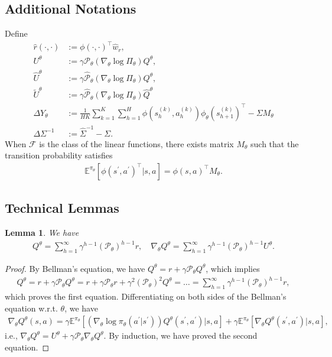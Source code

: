 \documentclass{article}
\newtheorem{lemma}{Lemma}[section]
\numberwithin{equation}{section}
\begin{document}
\subsection{Additional Notations}
Define
\begin{align*}
\widehat{r}(\cdot,\cdot)&:= \phi(\cdot,\cdot)^\top \widehat{w}_r,\\
U^\theta &:=\gamma\mathcal{P}_\theta\left(\nabla_\theta\log\Pi_\theta\right) Q^\theta,\\
\widehat{U}^\theta&:=\gamma\widehat{\mathcal{P}}_\theta\left(\nabla_\theta\log\Pi_\theta\right)Q^\theta,\\
\tilde{U}^\theta&:=\gamma\widehat{\mathcal{P}}_\theta\left(\nabla_\theta\log\Pi_\theta\right)\widehat{Q}^\theta\\
\Delta Y_\theta&:=\frac{1}{HK}\sum_{k=1}^K\sum_{h=1}^H\phi\left(s_h^{(k)},a_h^{(k)}\right)\phi_\theta\left(s_{h+1}^{(k)}\right)^\top-\Sigma M_\theta\\
\Delta\Sigma^{-1}&:=\widehat{\Sigma}^{-1}-\Sigma.
\end{align*}
When $\mathcal{F}$ is the class of the linear functions, there exists matrix $M_\theta$ such that the transition probability satisfies
\begin{align*}
    \mathbb{E}^{\pi_\theta}\left[\phi(s^\prime,a^\prime)^\top\vert s,a\right] = \phi(s,a)^\top M_\theta. 
\end{align*}

\subsection{Technical Lemmas}
\begin{lemma}
\label{Q_decomp_base_homo}
We have
\begin{align*}
    Q^\theta=\sum_{h=1}^\infty\gamma^{h-1}\left(\mathcal{P}_\theta\right)^{h-1}r,\quad\nabla_\theta Q^\theta=\sum_{h=1}^\infty\gamma^{h-1}\left(\mathcal{P}_\theta\right)^{h-1}U^\theta.
\end{align*}
\end{lemma}
\begin{proof}
By Bellman's equation, we have $Q^\theta=r+\gamma\mathcal{P}_\theta Q^\theta$, which implies
\begin{align*}
Q^\theta = r+\gamma\mathcal{P}_\theta Q^\theta = r+\gamma\mathcal{P}_\theta r + \gamma^2\left(\mathcal{P}_\theta\right)^2 Q^\theta = \ldots = \sum_{h=1}^\infty\gamma^{h-1}\left(\mathcal{P}_\theta\right)^{h-1}r,
\end{align*}
which proves the first equation. Differentiating on both sides of the Bellman's equation w.r.t. $\theta$, we have
\begin{align*}
    \nabla_\theta Q^\theta(s,a)=\gamma\mathbb{E}^{\pi_\theta}\left[\left(\nabla_\theta\log\pi_\theta(a^\prime\vert s^\prime)\right)Q^\theta(s^\prime,a^\prime)\vert s,a\right]+\gamma\mathbb{E}^{\pi_\theta}\left[\nabla_\theta Q^\theta(s^\prime,a^\prime)\vert s,a\right],
\end{align*}
i.e., $\nabla_\theta Q^\theta=U^\theta+\gamma\mathcal{P}_\theta\nabla_\theta Q^\theta$. By induction, we have proved the second equation. 
\end{proof}
\end{document}

